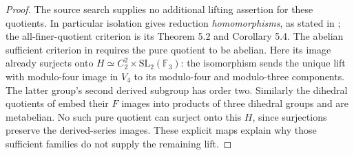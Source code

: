 \begin{proof}
The source search supplies no additional lifting assertion
for these quotients. In particular isolation gives reduction
\emph{homomorphisms}, as stated in
\cite[Remark 3.16]{dDolgushevGuynee2024}; the all-finer-quotient
criterion is its Theorem 5.2 and Corollary 5.4.
The abelian sufficient criterion in
\cite[TheoremB.2]{dDolgushevLeLorenz2024} requires the
pure quotient to be abelian. Here its image already
surjects onto
$H\simeq C_2^2\times\mathrm{SL}_2(\mathbb F_3)$:
the isomorphism sends the unique lift with modulo-four
image in $V_4$ to its modulo-four and modulo-three components.
The latter group's second derived subgroup has order two.
Similarly the dihedral quotients of
\cite[Remark 3.2]{dBDHP2026} embed their $F$ images into
products of three dihedral groups and are metabelian.
No such pure quotient can surject onto this $H$, since
surjections preserve the derived-series images.
These explicit maps explain why those sufficient families
do not supply the remaining lift.
\end{proof}
